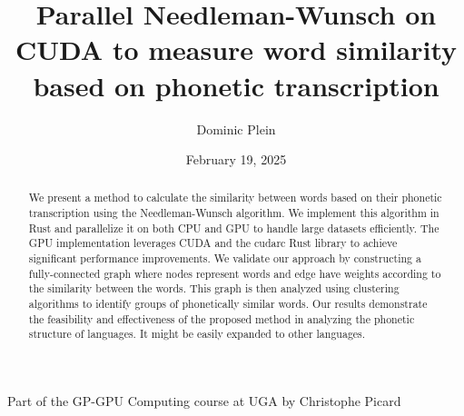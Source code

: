 \documentclass[10pt,a4paper,english]{article}
\title{\vspace{-0.0em}Parallel Needleman-Wunsch on CUDA to measure word similarity based on phonetic transcription}
\author{Dominic Plein}
\date{February 19, 2025}
\newcommand{\abstractText}{\noindent
	\newline\noindent
    We present a method to calculate the similarity between words based on their phonetic transcription using the Needleman-Wunsch algorithm. We implement this algorithm in Rust and parallelize it on both CPU and GPU to handle large datasets efficiently. The GPU implementation leverages CUDA and the cudarc Rust library to achieve significant performance improvements. We validate our approach by constructing a fully-connected graph where nodes represent words and edge have weights according to the similarity between the words. This graph is then analyzed using clustering algorithms to identify groups of phonetically similar words. Our results demonstrate the feasibility and effectiveness of the proposed method in analyzing the phonetic structure of languages. It might be easily expanded to other languages.
}
\begin{document}
\setlength{\abovedisplayskip}{0.2em}

\maketitle
\begin{center}
    \small{Part of the GP-GPU Computing course at UGA by Christophe Picard}
\end{center}

\begin{abstract}
    \abstractText
    \newline
    \newline
\end{abstract}



\begin{multicols*}{2}
\tableofcontents

\newcolumn





\end{multicols*}

\printglossary[type=\acronymtype]
\end{document}
